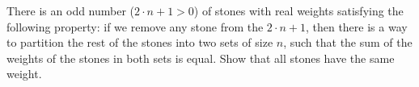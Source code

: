 \begin{problem}
    There is an odd number (\( 2 \cdot n + 1 > 0 \)) of stones with real weights satisfying the following property: if we remove any stone from the \( 2 \cdot n + 1 \), then there is a way to partition the rest of the stones into two sets of size \( n \), such that the sum of the weights of the stones in both sets is equal. Show that all stones have the same weight.
\end{problem}
